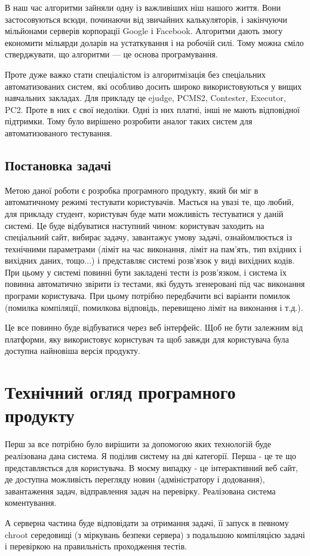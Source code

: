 В наш час алгоритми зайняли одну із важливіших ніш нашого життя. Вони застосовуються всюди, починаючи від звичайних калькуляторів, і закінчуючи мільйонами серверів корпорації Google і  Facebook. Алгоритми дають змогу економити мільярди доларів на устаткування і на робочій силі. Тому можна сміло стверджувати, що алгоритми --- це основа програмування.
\par Проте дуже важко стати спеціалістом із алгоритмізація без спеціальних автоматизованих систем, які особливо досить широко використовуються у вищих навчальних закладах. Для прикладу це ejudge, PCMS2, Contester, Executor, PC2. Проте в них є свої недоліки. Одні із них платні, інші не мають відповідної підтримки. Тому було вирішено розробити аналог таких систем для автоматизованого тестування.

\subsection{Постановка задачі}
Метою даної роботи є розробка програмного продукту, який би міг в автоматичному режимі тестувати користувачів. Мається на увазі те, що любий, для прикладу студент, користувач буде мати можливість тестуватися у даній системі. Це буде відбуватися наступний чином: користувач заходить на спеціальний сайт, вибирає задачу, завантажує умову задачі, ознайомлюється із технічними параметрами (ліміт на час виконання, ліміт на пам'ять, тип вхідних і вихідних даних, тощо...) і представляє системі розв'язок у виді вихідних кодів. При цьому у системі повинні бути закладені тести із розв'язком, і система їх повинна автоматично звірити із тестами, які будуть згенеровані під час виконання програми користувача. При цьому потрібно передбачити всі варіанти помилок (помилка компіляції, помилкова відповідь, перевищено ліміт на виконання і т.д.). 
\par Це все повинно буде відбуватися через веб інтерфейс. Щоб не бути залежним від платформи, яку використовує користувач та щоб завжди для користувача була доступна найновіша версія продукту.



\section{Технічний огляд програмного продукту}
Перш за все потрібно було вирішити за допомогою яких технологій буде реалізована дана система. Я поділив систему на дві категорії. Перша - це те що представляється для користувача. В моєму випадку - це інтерактивний веб сайт, де доступна можливість перегляду новин (адміністратору і додовання), завантаження задач, відправлення задач на перевірку. Реалізована система коментування.
\par А серверна частина буде відповідати за отримання задачі, її запуск в певному chroot середовищі (з міркувань безпеки сервера) з подальшою компіляцією задачі і перевіркою на правильність проходження тестів.

